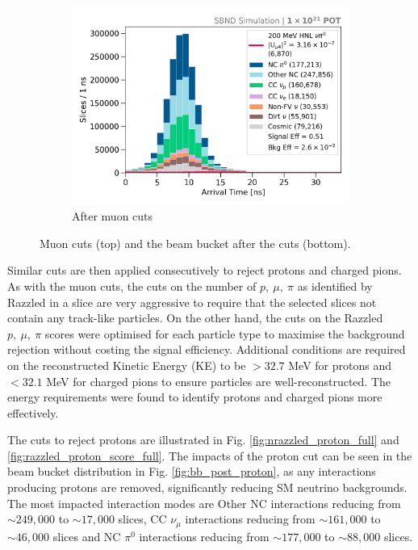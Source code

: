 \begin{figure}[hb!]
\begin{subfigure}[b]{0.495\textwidth}
            \centering 
            \includegraphics[width=\textwidth]{beam_bucket_postmuon}
            \caption{After muon cuts}%
            \label{fig:bb_post_muon}
        \end{subfigure}
	\caption[Muon Cuts]{
		Muon cuts (top) and the beam bucket after the cuts (bottom). 
	}
        \label{fig:razzled_muon_cut}
\end{figure}

Similar cuts are then applied consecutively to reject protons and charged pions.
As with the muon cuts, the cuts on the number of $p,\ \mu,\ \pi$ as identified by Razzled in a slice are very aggressive to require that the selected slices not contain any track-like particles.
On the other hand, the cuts on the Razzled $p,\ \mu,\ \pi$ scores were optimised for each particle type to maximise the background rejection without costing the signal efficiency.
Additional conditions are required on the reconstructed Kinetic Energy (KE) to be $ > 32.7$ MeV for protons and $< 32.1$ MeV for charged pions to ensure particles are well-reconstructed. 
The energy requirements were found to identify protons and charged pions more effectively.

The cuts to reject protons are illustrated in Fig. \ref{fig:nrazzled_proton_full} and \ref{fig:razzled_proton_score_full}.
The impacts of the proton cut can be seen in the beam bucket distribution in Fig. \ref{fig:bb_post_proton}, as any interactions producing protons are removed, significantly reducing SM neutrino backgrounds.
The most impacted interaction modes are Other NC interactions reducing from $\sim249,000$ to $\sim17,000$ slices, CC $\nu_\mu$ interactions reducing from $\sim161,000$ to $\sim46,000$ slices and NC $\pi^0$ interactions reducing from $\sim 177,000$ to $\sim88,000$ slices.

